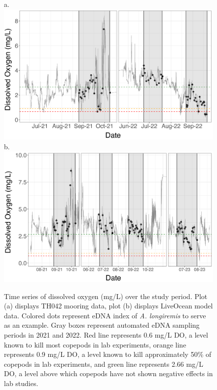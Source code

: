 \documentclass[12pt,twoside]{reedthesis}
\begin{document}
{	\begin{figure}[!h]
		\begin{center}
			a. \includegraphics[scale=0.6]{Timeseries_example} \\
			b. \includegraphics[scale=0.6]{Timeseries_example_Mod}
			\caption[Time series]{Time series of dissolved oxygen (mg/L) over the study period. Plot (a) displays TH042 mooring data, plot (b) displays LiveOcean model data. Colored dots represent eDNA index of \textit{A. longiremis} to serve as an example. Gray boxes represent automated eDNA sampling periods in 2021 and 2022. Red line represents 0.6 mg/L DO, a level known to kill most copepods in lab experiments, orange line represents 0.9 mg/L DO, a level known to kill approximately 50\% of copepods in lab experiments, and green line represents 2.66 mg/L DO, a level above which copepods have not shown negative effects in lab studies.} %
		\end{center}
		\label{Timeseries}
	\end{figure} 
	
}
\end{document}
